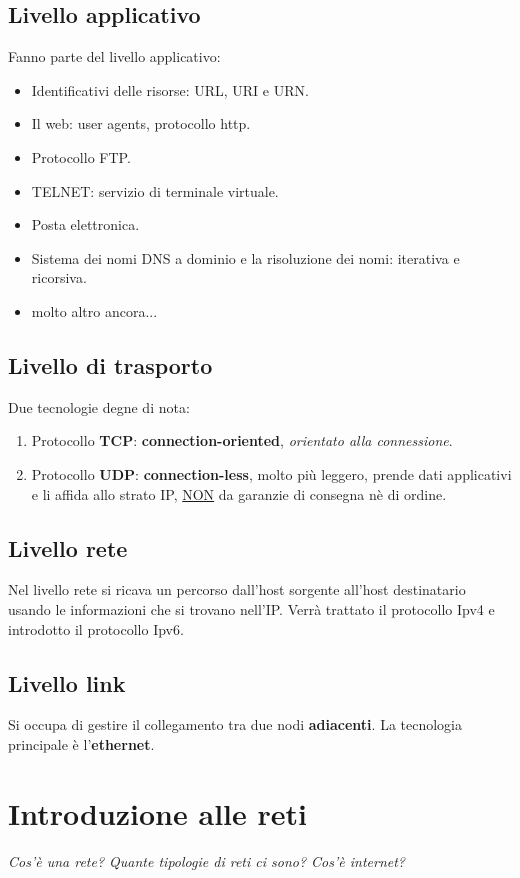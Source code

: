 \documentclass[11pt,a4paper]{article}
\theoremstyle{definition}
\begin{document}
\pagebreak

\subsection{Livello applicativo}
Fanno parte del livello applicativo:
\begin{itemize}
	\item Identificativi delle risorse: URL, URI e URN.
	\item Il web: user agents, protocollo http.
	\item Protocollo FTP.
	\item TELNET: servizio di terminale virtuale.
	\item Posta elettronica.
	\item Sistema dei nomi DNS a dominio e la risoluzione dei nomi: iterativa e ricorsiva.
	\item molto altro ancora...
\end{itemize}

\subsection{Livello di trasporto}
Due tecnologie degne di nota:
\begin{enumerate}
	\item Protocollo \textbf{TCP}: \textbf{connection-oriented}, \textit{orientato alla connessione}.
	\item Protocollo \textbf{UDP}: \textbf{connection-less}, molto più leggero, prende dati applicativi e li affida allo strato IP, \underline{NON} da garanzie di consegna nè di ordine.
\end{enumerate}

\subsection{Livello rete}
Nel livello rete si ricava un percorso dall'host sorgente all'host destinatario usando le informazioni che si trovano nell'IP.\newline
Verrà trattato il protocollo Ipv4 e introdotto il protocollo Ipv6.

\subsection{Livello link}
Si occupa di gestire il collegamento tra due nodi \textbf{adiacenti}.
La tecnologia principale è l'\textbf{ethernet}.
\pagebreak

\section{Introduzione alle reti}
\textit{Cos'è una rete? Quante tipologie di reti ci sono? Cos'è internet?}
\end{document}
